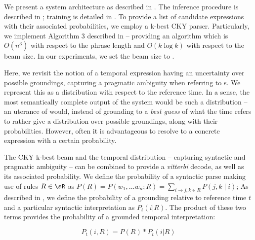 We present a system architecture as described in .
The inference procedure is described in ;
	training is detailed in .
To provide a list of
	candidate expressions with their associated probabilities, we
	employ a k-best CKY parser.
Particularly, we implement Algorithm 3 described in 
	 -- providing an algorithm which is
	$O(n^3)$ with respect to the phrase length and $O(k\log k)$ with respect
	to the beam size.
In our experiments, we set the beam size to .

Here, we revisit the notion of a temporal expression having an uncertainty
	over possible groundings, capturing a pragmatic ambiguity when
	referring to s.
We represent this as a distribution with respect to the reference time.
In a sense, the most semantically complete output of the system would be
	such a distribution -- 
	an uterance of  would, instead of grounding to a 
	\textit{best guess} of what the time refers to rather give a distribution
	over possible groundings, along with their probabilities.
However, often it is advantageous to resolve to a concrete expression with a
	certain probability.

The CKY k-best beam and the temporal distribution 
	-- capturing syntactic and pragmatic ambiguity --
	can be combined to provide a \textit{vitterbi} decode, as well as
	its associated probability.
We define the probability of a syntactic parse making use of rules $R \in \sR$ 
	as $P(R) = P(w_1,\dots w_n; R) = \sum_{i \rightarrow j,k \in R}P(j,k \mid i)$;
	As described in , we define the probability of a 
	grounding relative to reference time $t$ and a particular
	syntactic interpretation as $P_t(i | R)$.
The product of these two terms provides the probability of a grounded temporal
	interpretation:

\begin{equation}
	P_t(i, R) = 
		P( R ) * P_t(i | R)
\label{eqn:prob}
\end{equation}

